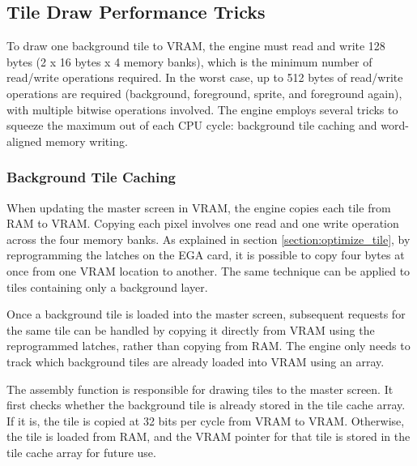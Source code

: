 \documentclass[book.tex]{subfiles}
\begin{document}
\subsection{Tile Draw Performance Tricks}
To draw one background tile to VRAM, the engine must read and write 128 bytes (2 x 16 bytes x 4 memory banks), which is the minimum number of read/write operations required. In the worst case, up to 512 bytes of read/write operations are required (background, foreground, sprite, and foreground again), with multiple bitwise operations involved.
The engine employs several tricks to squeeze the maximum out of each CPU cycle: background tile caching and word-aligned memory writing.

\subsubsection{Background Tile Caching}
When updating the master screen in VRAM, the engine copies each tile from RAM to VRAM. Copying each pixel involves one read and one write operation across the four memory banks. As explained in section \ref{section:optimize_tile}, by reprogramming the latches on the EGA card, it is possible to copy four bytes at once from one VRAM location to another. The same technique can be applied to tiles containing only a background layer.\\

\par
Once a background tile is loaded into the master screen, subsequent requests for the same tile can be handled by copying it directly from VRAM using the reprogrammed latches, rather than copying from RAM. The engine only needs to track which background tiles are already loaded into VRAM using an array.\\

\par
\begin{minipage}{\textwidth}
  
\end{minipage}

\par
The assembly function  is responsible for drawing tiles to the master screen. It first checks whether the background tile is already stored in the tile cache array. If it is, the tile is copied at 32 bits per cycle from VRAM to VRAM. Otherwise, the tile is loaded from RAM, and the VRAM pointer for that tile is stored in the tile cache array for future use.\\
\end{document}
